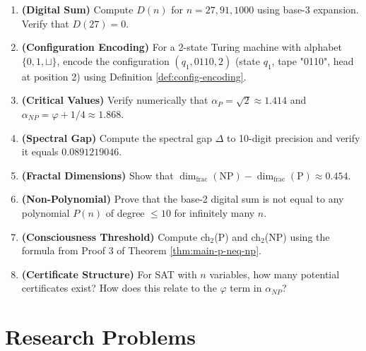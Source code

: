 \begin{enumerate}
\item \textbf{(Digital Sum)} Compute $D(n)$ for $n = 27, 91, 1000$ using base-3 expansion. Verify that $D(27) = 0$.

\item \textbf{(Configuration Encoding)} For a 2-state Turing machine with alphabet $\{0,1,\sqcup\}$, encode the configuration $(q_1, 0110, 2)$ (state $q_1$, tape "0110", head at position 2) using Definition \ref{def:config-encoding}.

\item \textbf{(Critical Values)} Verify numerically that $\alpha_P = \sqrt{2} \approx 1.414$ and $\alpha_{NP} = \varphi + 1/4 \approx 1.868$.

\item \textbf{(Spectral Gap)} Compute the spectral gap $\Delta$ to 10-digit precision and verify it equals $0.0891219046$.

\item \textbf{(Fractal Dimensions)} Show that $\dim_{\text{frac}}(\text{NP}) - \dim_{\text{frac}}(\text{P}) \approx 0.454$.

\item \textbf{(Non-Polynomial)} Prove that the base-2 digital sum is not equal to any polynomial $P(n)$ of degree $\leq 10$ for infinitely many $n$.

\item \textbf{(Consciousness Threshold)} Compute ch$_2$(P) and ch$_2$(NP) using the formula from Proof 3 of Theorem \ref{thm:main-p-neq-np}.

\item \textbf{(Certificate Structure)} For SAT with $n$ variables, how many potential certificates exist? How does this relate to the $\varphi$ term in $\alpha_{NP}$?

\end{enumerate}

\section*{Research Problems}

